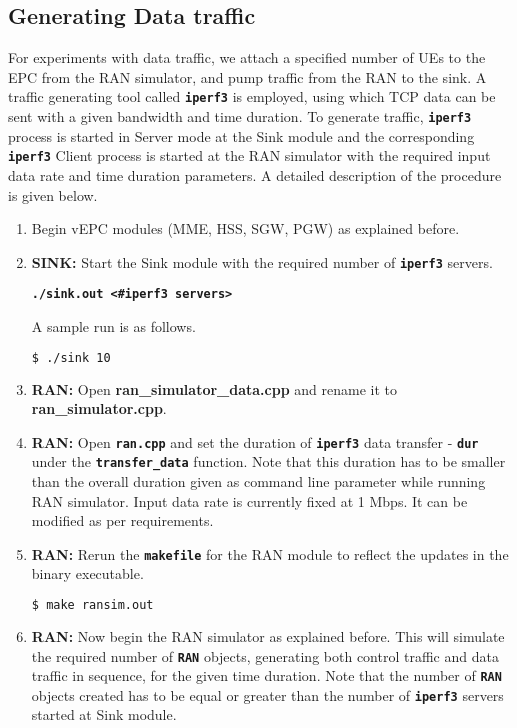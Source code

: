 \pdfminorversion=4\documentclass[hidelinks]{report}
\newcommand{\cf}[1] {
	\textbf{\texttt{#1}}
}
\begin{document}
\subsection*{Generating Data traffic}

For experiments with data traffic, we attach a specified number of UEs to the EPC from the RAN simulator, and pump traffic from the RAN to the sink. A traffic generating tool called \cf{iperf3} is employed, using which TCP data can be sent with a given bandwidth and time duration. To generate traffic, \cf{iperf3} process is started in Server mode at the Sink module and the corresponding \cf{iperf3} Client process is started at the RAN simulator with the required input data rate and time duration parameters. A detailed description of the procedure is given below.

\begin{enumerate}

\item Begin vEPC modules (MME, HSS, SGW, PGW) as explained before.

\item \textbf{SINK:} Start the Sink module with the required number of \cf{iperf3} servers.

\begin{center}

\cf{./sink.out <\#iperf3 servers>}

\end{center}

A sample run is as follows.

\begin{lstlisting}[language=bash]
$ ./sink 10
\end{lstlisting}

\item \textbf{RAN:} Open \textbf{ran\_simulator\_data.cpp} and rename it to \textbf{ran\_simulator.cpp}. 

\item \textbf{RAN:} Open \cf{ran.cpp} and set the duration of \cf{iperf3} data transfer - \cf{dur} under the \cf{transfer\_data} function. Note that this duration has to be smaller than the overall duration given as command line parameter while running RAN simulator. Input data rate is currently fixed at 1 Mbps. It can be modified as per requirements.

\item \textbf{RAN:} Rerun the \cf{makefile} for the RAN module to reflect the updates in the binary executable.

\begin{lstlisting}[language=bash]
$ make ransim.out
\end{lstlisting}

\item \textbf{RAN:} Now begin the RAN simulator as explained before. This will simulate the required number of \cf{RAN} objects, generating both control traffic and data traffic in sequence, for the given time duration. Note that the number of \cf{RAN} objects created has to be equal or greater than the number of \cf{iperf3} servers started at Sink module.

\end{enumerate}
\end{document}
